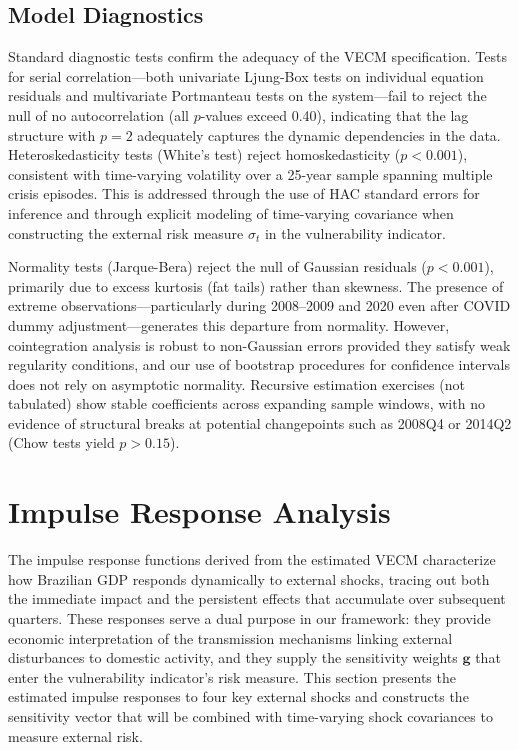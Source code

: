 \documentclass[12pt,a4paper]{article}
\numberwithin{equation}{section}
\theoremstyle{definition}
\theoremstyle{remark}
\newcommand{\vect}[1]{\boldsymbol{#1}}
\begin{document}
\subsection{Model Diagnostics}

Standard diagnostic tests confirm the adequacy of the VECM specification. Tests for serial correlation---both univariate Ljung-Box tests on individual equation residuals and multivariate Portmanteau tests on the system---fail to reject the null of no autocorrelation (all $p$-values exceed 0.40), indicating that the lag structure with $p=2$ adequately captures the dynamic dependencies in the data. Heteroskedasticity tests (White's test) reject homoskedasticity ($p < 0.001$), consistent with time-varying volatility over a 25-year sample spanning multiple crisis episodes. This is addressed through the use of HAC standard errors for inference and through explicit modeling of time-varying covariance when constructing the external risk measure $\sigma_t$ in the vulnerability indicator.

Normality tests (Jarque-Bera) reject the null of Gaussian residuals ($p < 0.001$), primarily due to excess kurtosis (fat tails) rather than skewness. The presence of extreme observations---particularly during 2008--2009 and 2020 even after COVID dummy adjustment---generates this departure from normality. However, cointegration analysis is robust to non-Gaussian errors provided they satisfy weak regularity conditions, and our use of bootstrap procedures for confidence intervals does not rely on asymptotic normality. Recursive estimation exercises (not tabulated) show stable coefficients across expanding sample windows, with no evidence of structural breaks at potential changepoints such as 2008Q4 or 2014Q2 (Chow tests yield $p > 0.15$).


\section{Impulse Response Analysis}
\label{sec:irf}

The impulse response functions derived from the estimated VECM characterize how Brazilian GDP responds dynamically to external shocks, tracing out both the immediate impact and the persistent effects that accumulate over subsequent quarters. These responses serve a dual purpose in our framework: they provide economic interpretation of the transmission mechanisms linking external disturbances to domestic activity, and they supply the sensitivity weights $\vect{g}$ that enter the vulnerability indicator's risk measure. This section presents the estimated impulse responses to four key external shocks and constructs the sensitivity vector that will be combined with time-varying shock covariances to measure external risk.
\end{document}
